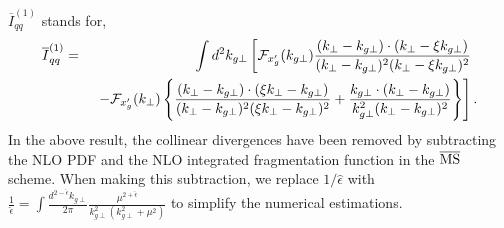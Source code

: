\documentclass[prd,aps,preprint,tightenlines,nofootinbib,superscriptaddress]{revtex4}
\begin{document}
  $\overline{I}^{(1)}_{qq}$  stands for, 
\begin{eqnarray}
  \overline{I}^{(1)}_{qq}&=&\int d^2k_{g\perp}\left[{\cal F}_{x_g'}(k_{g\perp})\frac{(k_\perp-k_{g\perp})\cdot(k_{\perp}-\xi k_{g\perp})}{(k_\perp-k_{g\perp})^2(k_{\perp}-\xi k_{g\perp})^2} \right .\ \nonumber \\ &&\left .\
  -{\cal F}_{x_g'}(k_{\perp})\left\{\frac{(k_\perp-k_{g\perp})\cdot(\xi k_{\perp}-k_{g\perp})}{(k_\perp-k_{g\perp})^2(\xi k_{\perp}-k_{g\perp})^2}
  +\frac{k_{g\perp}\cdot(k_{\perp}-k_{g\perp})}{k_{g\perp}^2(k_{\perp}-k_{g\perp})^2}\right\}\right].
  \label{eq:Iqq}
  \end{eqnarray}
 In the above result,  the collinear divergences  have been removed by subtracting    the NLO PDF and the NLO integrated fragmentation function in the $\overline{\rm MS}$ scheme.  When making this subtraction, we replace  $1/\hat\epsilon$ with
$  \frac{1}{\hat \epsilon }=  \int \frac{ d^{2- \hat \epsilon } k_{g\perp}}{2\pi}  \frac{\mu^{2+\hat \epsilon} }{k_{g\perp}^2 (k_{g\perp}^2+\mu^2)}$ to simplify  the numerical estimations.  
\end{document}
